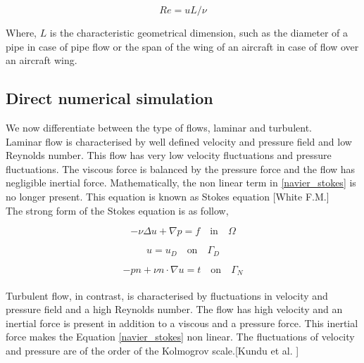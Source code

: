 \documentclass[a4paper,openany]{book}
\begin{document}
\begin{equation} \label{reynolds_number}
Re =  u L / \nu
\end{equation}

Where, $L$ is the characteristic geometrical dimension, such as the diameter of a pipe in case of pipe flow or the span of the wing of an aircraft in case of flow over an aircraft wing.\\

\subsection[DNS]{Direct numerical simulation} 

We now differentiate between the type of flows, laminar and turbulent.\\

Laminar flow is characterised by well defined velocity and pressure field and low Reynolds number. This flow has very low velocity fluctuations and pressure fluctuations. The viscous force is balanced by the pressure force and the flow has negligible inertial force. Mathematically, the non linear term in \eqref{navier_stokes} is no longer present. This equation is known as Stokes equation [White F.M.\cite{white}]\\

The strong form of the Stokes equation is as follow,

\begin{equation} \label{stokes_strong_form}
-\nu \Delta u + \nabla p = f \quad \textrm{in} \quad \Omega
\end{equation}

\begin{equation} \label{dirichlet condition stokes}
u = u_D \quad \textrm{on} \quad \Gamma_D
\end{equation}

\begin{equation} \label{neumann condition stokes}
-pn + \nu n \cdot \nabla u = t \quad \textrm{on} \quad \Gamma_N
\end{equation}
\\

Turbulent flow, in contrast, is characterised by fluctuations in velocity and pressure field and a high Reynolds number. The flow has high velocity and an inertial force is present in addition to a viscous and a pressure force. This inertial force makes the Equation \eqref{navier_stokes} non linear. The fluctuations of velocity and pressure are of the order of the Kolmogrov scale.[Kundu et al. \cite{Kundu}]\\
\end{document}

